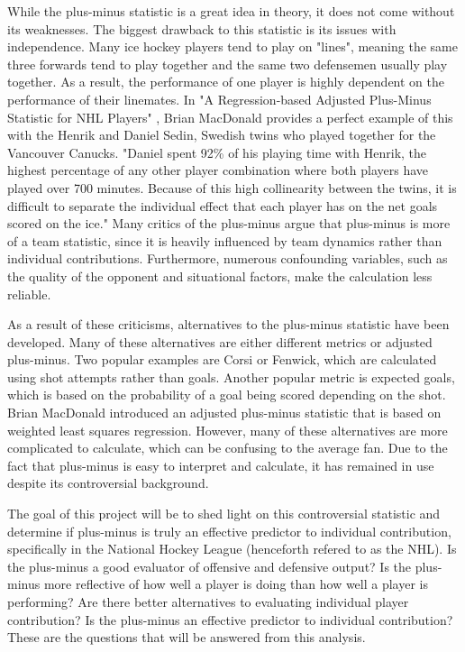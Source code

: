 \documentclass[12pt]{article}
\begin{document}
While the plus-minus statistic is a great idea in theory, it does not come without its weaknesses. The biggest drawback to this
statistic is its issues with independence. Many ice hockey players tend to play on "lines", meaning the same three 
forwards tend to play together and the same two defensemen usually play together. As a result, the performance of one player is highly dependent 
on the performance of their linemates. In "A Regression-based Adjusted Plus-Minus Statistic for NHL Players" \cite{Macdonald_2011}, Brian
MacDonald provides a perfect example of this with the Henrik and Daniel Sedin, Swedish twins who played together for the Vancouver Canucks. 
"Daniel spent 92\% of his playing time with Henrik, the highest percentage of any other player combination where both players have
played over 700 minutes. Because of this high collinearity between the twins, it is difficult to separate the individual effect that each 
player has on the net goals scored on the ice."\cite{Macdonald_2012} Many critics of the plus-minus argue that plus-minus is more of a team 
statistic, since it is heavily influenced by team dynamics rather than individual contributions. Furthermore, numerous confounding variables, 
such as the quality of the opponent and situational factors, make the calculation less reliable. 

As a result of these criticisms, alternatives to the plus-minus statistic have been developed. Many of these alternatives are either different 
metrics or adjusted plus-minus\cite{plus_minus_rating}. Two popular examples are Corsi or Fenwick, which are calculated using shot attempts 
rather than goals. Another popular metric is expected goals, which is based on the probability of a goal being scored depending on the shot.
Brian MacDonald introduced an adjusted plus-minus statistic that is based on weighted least squares regression\cite{Macdonald_2012}. However,
many of these alternatives are more complicated to calculate, which can be confusing to the average fan. Due to the fact that plus-minus
is easy to interpret and calculate, it has remained in use despite its controversial background.

The goal of this project will be to shed light on this controversial statistic and determine if plus-minus is truly an effective predictor
to individual contribution, specifically in the National Hockey League (henceforth refered to as the NHL). Is the plus-minus a good evaluator 
of offensive and defensive output? Is the plus-minus more reflective of how well a player is doing than how well a player is performing? 
Are there better alternatives to evaluating individual player contribution? Is the plus-minus an effective predictor to individual contribution? 
These are the questions that will be answered from this analysis.
\end{document}

